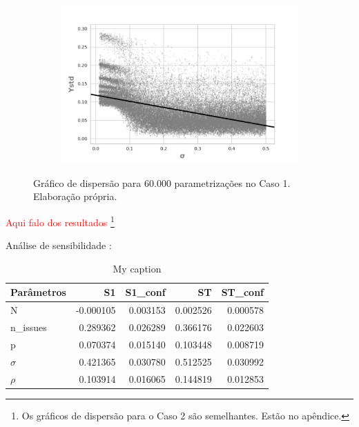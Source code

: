 \begin{figure}[H]
                \begin{subfigure}[b]{0.49\textwidth}
            \includegraphics[width=\textwidth]{ims/mutoregressions/regressionmutatingosigma.png}
    \end{subfigure}
    \caption{Gráfico de dispersão para 60.000 parametrizações no Caso 1.
      Elaboração própria.}\label{fig:scatter1}
\end{figure}

\textcolor{red}{Aqui falo dos resultados}
\footnote{Os gráficos de dispersão para o Caso 2 são semelhantes. Estão no apêndice.}


Análise de sensibilidade :



\begin{table}[]
\centering
\caption{My caption}
\label{my-label}
\begin{tabular}{|l|r|r|r|r|}
\hline
\rowcolor[HTML]{C0C0C0} 
Parâmetros & S1        & S1\_conf & ST       & ST\_conf \\ \hline
N          & -0.000105 & 0.003153 & 0.002526 & 0.000578 \\ \hline
n\_issues  & 0.289362  & 0.026289 & 0.366176 & 0.022603 \\ \hline
p          & 0.070374  & 0.015140 & 0.103448 & 0.008719 \\ \hline
\(\sigma\) & 0.421365  & 0.030780 & 0.512525 & 0.030992 \\ \hline
\(\rho\)   & 0.103914  & 0.016065 & 0.144819 & 0.012853 \\ \hline
\end{tabular}
\end{table}

